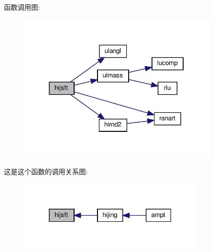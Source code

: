 函数调用图\+:
\nopagebreak
\begin{figure}[H]
\begin{center}
\leavevmode
\includegraphics[width=286pt]{hijsft_8f90_a855def5e703c65c2cdf62baa25ce460b_cgraph}
\end{center}
\end{figure}
这是这个函数的调用关系图\+:
\nopagebreak
\begin{figure}[H]
\begin{center}
\leavevmode
\includegraphics[width=267pt]{hijsft_8f90_a855def5e703c65c2cdf62baa25ce460b_icgraph}
\end{center}
\end{figure}
